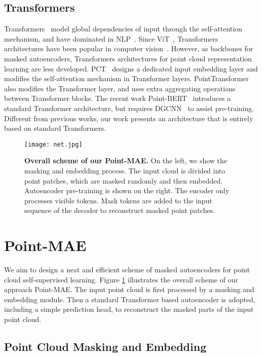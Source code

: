 \documentclass[runningheads]{llncs}
\begin{document}
\subsection{Transformers}
Transformers~\cite{tf} model global dependencies of input through the self-attention mechanism, and have dominated in NLP~\cite{bert,nlp1,nlp2,nlp3,nlp4}. Since ViT~\cite{cvvit}, Transformers architectures have been popular in computer vision~\cite{cvt2t,tfswin,cvvolo,cvcross,cvpvt,ptpt,ptpct,chen2021full}. However, as backbones for masked autoencoders, Transformers architectures for point cloud representation learning are less developed. PCT~\cite{ptpct} designs a dedicated input embedding layer and modifies the self-attention mechanism in Transformer layers. PointTransformer~\cite{ptpt} also modifies the Transformer layer, and uses extra aggregating operations between Transformer blocks. The recent work Point-BERT~\cite{pointbert} introduces a standard Transformer architecture, but requires DGCNN~\cite{ptdgcnn} to assist pre-training. Different from previous works, our work presents an architecture that is entirely based on standard Transformers.


\begin{figure}
    \centering
    \texttt{[image: net.jpg]}
    \caption{{\bf Overall scheme of our Point-MAE.} On the left, we show the masking and embedding process. The input cloud is divided into point patches, which are masked randomly and then embedded. Autoencoder pre-training is shown on the right. The encoder only processes visible tokens. Mask tokens are added to the input sequence of the decoder to reconstruct masked point patches.}
    \label{fig:net}
\end{figure}

\section{Point-MAE}
We aim to design a neat and efficient scheme of masked autoencoders for point cloud self-supervised learning. Figure \ref{fig:net} illustrates the overall scheme of our approach Point-MAE. The input point cloud is first processed by a masking and embedding module. Then a standard Transformer based autoencoder is adopted, including a simple prediction head, to reconstruct the masked parts of the input point cloud.

\subsection{Point Cloud Masking and Embedding}
\end{document}
